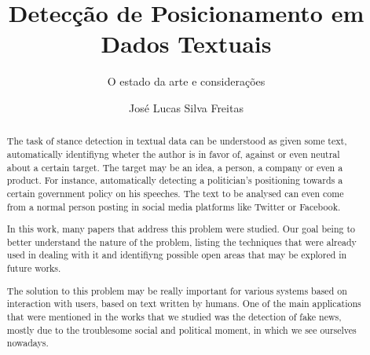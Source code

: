 \documentclass[12pt, sigconf]{acmart}
\begin{document}
\title{Detecção de Posicionamento em Dados Textuais}
\subtitle{O estado da arte e considerações}

\author{José Lucas Silva Freitas}

\renewcommand{\shortauthors}{Lucas Freitas et al.}


\begin{abstract}

\quad  The task of stance detection in textual data can be understood as
given some text, automatically identifiyng wheter the author is in favor of,
against or even neutral about a certain target. The target may be an idea,
a person, a company or even a product. For instance, automatically detecting
a politician's positioning towards a certain government policy
on his speeches. The text to be analysed can even come from a normal person 
posting in social media platforms like Twitter or Facebook.

\quad  In this work, many papers that address this problem were studied. Our goal
being to better understand the nature of the problem, listing the techniques
that were already used in dealing with it and identifiyng possible open
areas that may be explored in future works.

\quad  The solution to this problem may be really important for various systems
based on interaction with users, based on text written by humans. One
of the main applications that were mentioned in the works that we studied
was the detection of fake news, mostly due to the troublesome social and 
political moment, in which we see ourselves nowadays.
\end{abstract}
\maketitle




\end{document}
